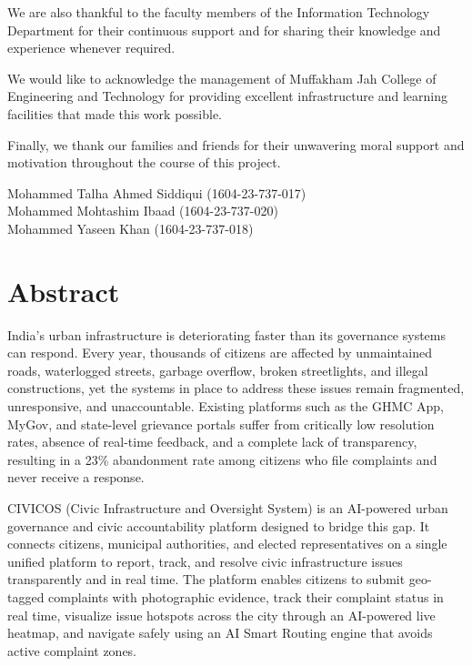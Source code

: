 \documentclass[12pt,a4paper]{report}
\begin{document}
We are also thankful to the faculty members of the Information Technology
Department for their continuous support and for sharing their knowledge and
experience whenever required.

We would like to acknowledge the management of Muffakham Jah College of
Engineering and Technology for providing excellent infrastructure and learning
facilities that made this work possible.

Finally, we thank our families and friends for their unwavering moral support
and motivation throughout the course of this project.

\vspace{2.5cm}

\begin{flushright}
\onehalfspacing
Mohammed Talha Ahmed Siddiqui \quad (1604-23-737-017)\\[0.4cm]
Mohammed Mohtashim Ibaad \quad (1604-23-737-020)\\[0.4cm]
Mohammed Yaseen Khan \quad (1604-23-737-018)
\end{flushright}

\newpage

\chapter*{Abstract}
\thispagestyle{empty}

India's urban infrastructure is deteriorating faster than its governance systems
can respond. Every year, thousands of citizens are affected by unmaintained
roads, waterlogged streets, garbage overflow, broken streetlights, and illegal
constructions, yet the systems in place to address these issues remain
fragmented, unresponsive, and unaccountable. Existing platforms such as the
GHMC App, MyGov, and state-level grievance portals suffer from critically low
resolution rates, absence of real-time feedback, and a complete lack of
transparency, resulting in a 23\% abandonment rate among citizens who file
complaints and never receive a response.

CIVICOS (Civic Infrastructure and Oversight System) is an AI-powered urban
governance and civic accountability platform designed to bridge this gap. It
connects citizens, municipal authorities, and elected representatives on a
single unified platform to report, track, and resolve civic infrastructure
issues transparently and in real time. The platform enables citizens to submit
geo-tagged complaints with photographic evidence, track their complaint status
in real time, visualize issue hotspots across the city through an AI-powered
live heatmap, and navigate safely using an AI Smart Routing engine that avoids
active complaint zones.
\end{document}

